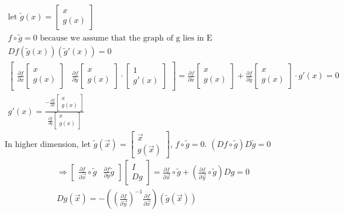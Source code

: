 \documentclass[11pt]{article}
\theoremstyle{break}
\theoremstyle{break}
\begin{document}
\begin{align*}
\text{let } \widetilde{g}(x) = \begin{bmatrix}
x \\ g(x) 
\end{bmatrix}\\
f\circ \widetilde{g} = 0 \text{ because we assume that the graph of g lies in E}\\
Df(\widetilde g(x))(\widetilde{g} ' (x)) = 0\\
\begin{bmatrix}
\frac{\partial f}{\partial x}\begin{bmatrix}
 x \\ g(x)
\end{bmatrix} & 
\frac{\partial f}{\partial y}\begin{bmatrix}
 x \\ g(x)
\end{bmatrix}\cdot \begin{bmatrix}
1 \\ g'(x)
\end{bmatrix} 
\end{bmatrix}= \frac{\partial f}{\partial x} \begin{bmatrix}
x \\ g(x)
\end{bmatrix} + \frac{\partial f}{\partial y}\begin{bmatrix}
x \\ g(x)
\end{bmatrix} \cdot g'(x) = 0\\
g'(x) = \frac{-\frac{\partial f}{\partial x} \begin{bmatrix}
x \\g(x)
\end{bmatrix}}{\frac{\partial f}{\partial y}\begin{bmatrix}
x \\ g(x)
\end{bmatrix}}
\end{align*}
In higher dimension, let $\widetilde{g}(\vec{x}) = \begin{bmatrix}
\vec{x} \\ g(\vec{x}) 
\end{bmatrix}$, $f\circ \widetilde{g}= 0$.
$(Df\circ \widetilde{g}) D\widetilde{g} = 0$
\begin{align*}
\Rightarrow \begin{bmatrix}
\frac{\partial f}{\partial \vec{x}}\circ \widetilde {g} & \frac{\partial f}{\partial y}\widetilde{g} 
\end{bmatrix} \begin{bmatrix}
 I \\ Dg
\end{bmatrix} = \frac{\partial f}{\partial \vec{x}}\circ \widetilde{g} + (\frac{\partial f}{\partial \vec{y}}\circ \widetilde{g}) Dg = 0\\
Dg(\vec{x}) = -\left(\left(\frac{\partial f}{\partial  \vec{y}} \right)^{-1} \frac{\partial f}{\partial \vec{x}} \right)(\widetilde{g}(\vec{x}))
\end{align*}
\end{document}
